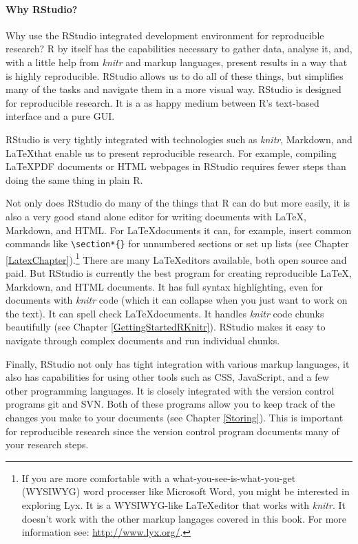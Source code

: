 \paragraph{Why RStudio?}

Why use the RStudio integrated development environment for reproducible research? R by itself has the capabilities necessary to gather data, analyse it, and, with a little help from {\emph{knitr}} and markup languages, present results in a way that is highly reproducible. RStudio allows us to do all of these things, but simplifies many of the tasks and navigate them in a more visual way. RStudio is designed for reproducible research. It is a as happy medium between R's text-based interface and a pure GUI. 

RStudio is very tightly integrated with technologies such as {\emph{knitr}}, Markdown, and \LaTeX that enable us to present reproducible research. For example, compiling \LaTeX PDF documents or HTML webpages in RStudio requires fewer steps than doing the same thing in plain R. 

Not only does RStudio do many of the things that R can do but more easily, it is also a very good stand alone editor for writing documents with \LaTeX, Markdown, and HTML. For \LaTeX documents it can, for example, insert common commands like \texttt{\textbackslash{}section*\{\}} for unnumbered sections or set up lists (see Chapter \ref{LatexChapter}).\footnote{If you are more comfortable with a what-you-see-is-what-you-get (WYSIWYG) word processer like Microsoft Word, you might be interested in exploring Lyx. It is a WYSIWYG-like \LaTeX editor that works with {\emph{knitr}}. It doesn't work with the other markup langages covered in this book. For more information see: \url{http://www.lyx.org/}.}  There are many \LaTeX editors available, both open source and paid. But RStudio is currently the best program for creating reproducible \LaTeX, Markdown, and HTML documents. It has full syntax highlighting, even for documents with {\emph{knitr}} code (which it can collapse when you just want to work on the text). It can spell check \LaTeX documents. It handles {\emph{knitr}} code chunks beautifully (see Chapter \ref{GettingStartedRKnitr}). RStudio makes it easy to navigate through complex documents and run individual chunks. 

Finally, RStudio not only has tight integration with various markup languages, it also has capabilities for using other tools such as CSS, JavaScript, and a few other programming languages. It is closely integrated with the version control programs git and SVN. Both of these programs allow you to keep track of the changes you make to your documents (see Chapter \ref{Storing}). This is important for reproducible research since the version control program documents many of your research steps. 

